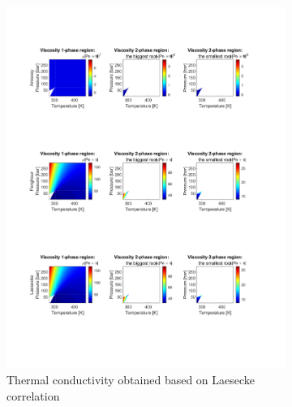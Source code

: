 \documentclass[../Article_Model_Parameters.tex]{subfiles}
\begin{document}
\begin{figure}[H]
\begin{subfigure}[b]{0.31\textwidth}
			\label{fig: SFE_Properties_h}
		\end{subfigure}
		\hfill
		\begin{subfigure}[b]{0.31\textwidth}
			\centering
			\includegraphics[trim = 1.5cm 4.0cm  14cm 19.0cm,clip,width=\textwidth]{Figures/MU.pdf}
			\caption{Thermal conductivity obtained based on Laesecke correlation}
			\label{fig: SFE_Properties_Viscosity}
		\end{subfigure}
		\hfill
		\begin{subfigure}[b]{0.31\textwidth}
			\centering

\end{subfigure}
\end{figure}
\end{document}
